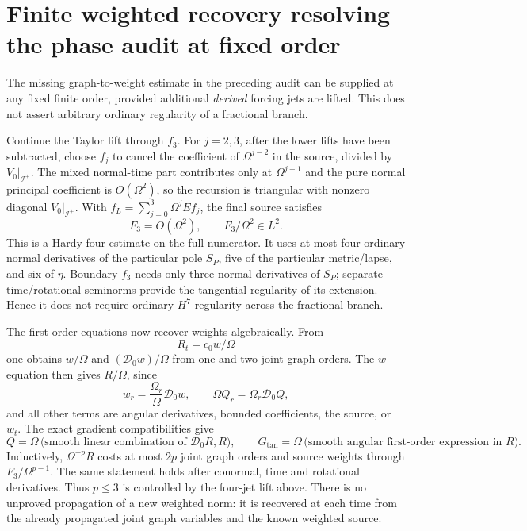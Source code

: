 \documentclass[11pt]{article}
\newcommand{\scri}{\mathscr I^+}
\begin{document}
\section{Finite weighted recovery resolving the phase audit at fixed order}
The missing graph-to-weight estimate in the preceding audit can be supplied at any fixed finite order, provided additional \emph{derived} forcing jets are lifted. This does not assert arbitrary ordinary regularity of a fractional branch.

Continue the Taylor lift through $f_3$. For $j=2,3$, after the lower lifts have been subtracted, choose $f_j$ to cancel the coefficient of $\Omega^{j-2}$ in the source, divided by $V_0|_{\scri}$. The mixed normal-time part contributes only at $\Omega^{j-1}$ and the pure normal principal coefficient is $O(\Omega^2)$, so the recursion is triangular with nonzero diagonal $V_0|_{\scri}$. With $f_L=\sum_{j=0}^3\Omega^jEf_j$, the final source satisfies
\[
 F_3=O(\Omega^2),\qquad F_3/\Omega^2\in L^2.
\]
This is a Hardy-four estimate on the full numerator. It uses at most four ordinary normal derivatives of the particular pole $S_P$, five of the particular metric/lapse, and six of $\eta$. Boundary $f_3$ needs only three normal derivatives of $S_P$; separate time/rotational seminorms provide the tangential regularity of its extension. Hence it does not require ordinary $H^7$ regularity across the fractional branch.

The first-order equations now recover weights algebraically. From
\[
 R_t=c_0w/\Omega
\]
one obtains $w/\Omega$ and $(\mathcal D_0w)/\Omega$ from one and two joint graph orders. The $w$ equation then gives $R/\Omega$, since
\[
 w_r=\frac{\Omega_r}{\Omega}\mathcal D_0w,
 \qquad \Omega Q_r=\Omega_r\mathcal D_0Q,
\]
and all other terms are angular derivatives, bounded coefficients, the source, or $w_t$. The exact gradient compatibilities give
\[
 Q=\Omega\,\text{(smooth linear combination of }\mathcal D_0R,R),
 \qquad G_{\tan}=\Omega\,\text{(smooth angular first-order expression in }R).
\]
Inductively, $\Omega^{-p}R$ costs at most $2p$ joint graph orders and source weights through $F_3/\Omega^{p-1}$. The same statement holds after conormal, time and rotational derivatives. Thus $p\le3$ is controlled by the four-jet lift above. There is no unproved propagation of a new weighted norm: it is recovered at each time from the already propagated joint graph variables and the known weighted source.
\end{document}
